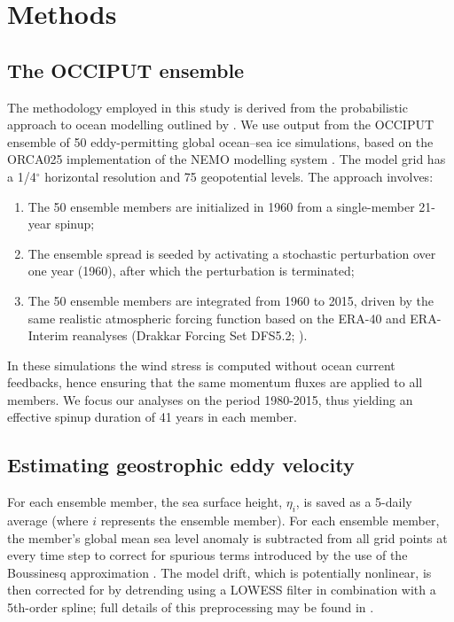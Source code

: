 \documentclass[linenumbers]{agujournal2019}
\begin{document}
\section{Methods}

\subsection{The OCCIPUT ensemble}

The methodology employed in this study is derived from the probabilistic approach to ocean modelling outlined by \citet{Bessieres2017}.
We use output from the OCCIPUT ensemble of 50 eddy-permitting global ocean--sea ice simulations, based on the ORCA025 implementation \citep[e.g.][]{Barnier2006} of the NEMO modelling system \citep{Madec2012}. 
The model grid has a 1/4$^\circ$ horizontal resolution and 75 geopotential levels. 
The approach involves:
\begin{enumerate}
\item The 50 ensemble members are initialized in 1960 from a single-member 21-year spinup;
\item The ensemble spread is seeded by activating a stochastic perturbation \citep{Brankart-etal-2015} over one year (1960), after which the perturbation is terminated;
\item The 50 ensemble members are integrated from 1960 to 2015, driven by the same realistic atmospheric forcing function based on the ERA-40 and ERA-Interim reanalyses (Drakkar Forcing Set DFS5.2; \citet{Dussin-etal-2016}).
\end{enumerate}
In these simulations the wind stress is computed without ocean current feedbacks, hence ensuring that the same momentum fluxes are applied to all members. 
We focus our analyses on the period 1980-2015, thus yielding an effective spinup duration of 41 years in each member. 


\subsection{Estimating geostrophic eddy velocity}
For each ensemble member, the sea surface height, $\eta_i$, is saved as a 5-daily average (where $i$ represents the ensemble member). 
For each ensemble member, the member's global mean sea level anomaly is subtracted from all grid points at every time step to correct for spurious terms introduced by the use of the Boussinesq approximation \citep{Greatbatch1994}. 
The model drift, which is potentially nonlinear, is then corrected for by detrending using a LOWESS filter \citep{Cleveland1979} in combination with a 5th-order spline; full details of this preprocessing may be found in \cite{Close2020}.
\end{document}
